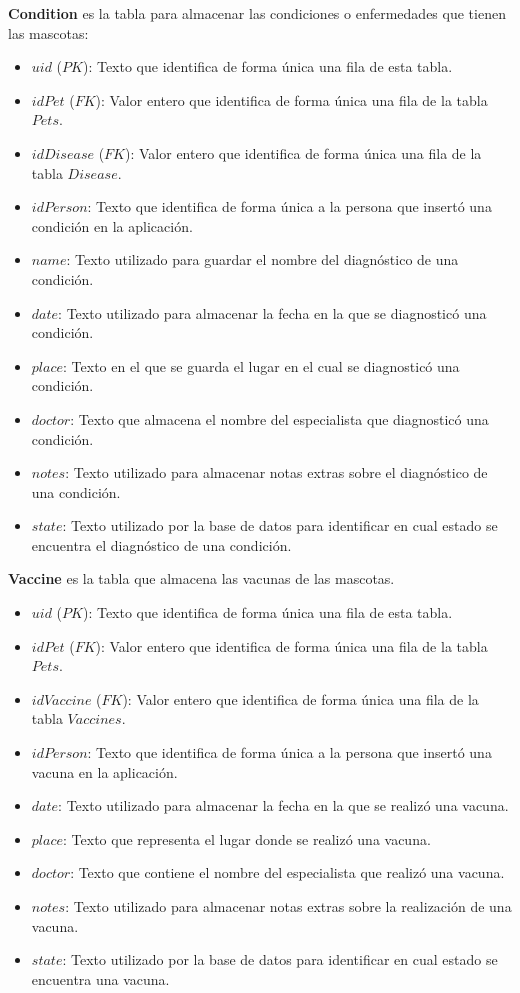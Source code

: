 \textbf{Condition} es la tabla para almacenar las condiciones o enfermedades que tienen las mascotas:

\begin{itemize}
\item	$uid$ ($PK$): Texto que identifica de forma única una fila de esta tabla.
\item	$idPet$ ($FK$): Valor entero que identifica de forma única una fila de la tabla $Pets$.
\item	$idDisease$ ($FK$): Valor entero que identifica de forma única una fila de la tabla $Disease$.
\item	$idPerson$: Texto que identifica de forma única a la persona que insertó una condición en la aplicación.
\item	$name$: Texto utilizado para guardar el nombre del diagnóstico de una condición.
\item	$date$: Texto utilizado para almacenar la fecha en la que se diagnosticó una condición.
\item	$place$: Texto en el que se guarda el lugar en el cual se diagnosticó una condición.
\item	$doctor$: Texto que almacena el nombre del especialista que diagnosticó una condición.
\item	$notes$: Texto utilizado para almacenar notas extras sobre el diagnóstico de una condición.
\item	$state$: Texto utilizado por la base de datos para identificar en cual estado se encuentra el diagnóstico de una condición.
\end{itemize}

\textbf{Vaccine} es la tabla que almacena las vacunas de las mascotas.

\begin{itemize}
\item	$uid$ ($PK$): Texto que identifica de forma única una fila de esta tabla.
\item	$idPet$ ($FK$): Valor entero que identifica de forma única una fila de la tabla $Pets$.
\item	$idVaccine$ ($FK$): Valor entero que identifica de forma única una fila de la tabla $Vaccines$.
\item	$idPerson$: Texto que identifica de forma única a la persona que insertó una vacuna en la aplicación.
\item	$date$: Texto utilizado para almacenar la fecha en la que se realizó una vacuna.
\item	$place$: Texto que representa el lugar donde se realizó una vacuna.
\item	$doctor$: Texto que contiene el nombre del especialista que realizó una vacuna.
\item	$notes$: Texto utilizado para almacenar notas extras sobre la realización de una vacuna.
\item	$state$: Texto utilizado por la base de datos para identificar en cual estado se encuentra una vacuna.
\end{itemize}


